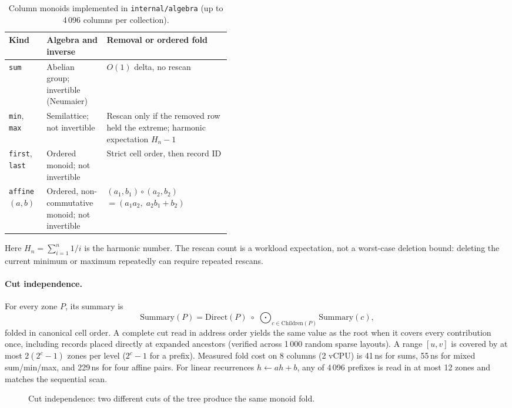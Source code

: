 \documentclass[11pt]{article}
\begin{document}
\begin{table}[H]
\centering
\footnotesize
\setlength{\tabcolsep}{4pt}
\renewcommand{\arraystretch}{1.18}
\begin{tabularx}{\linewidth}{@{}>{\raggedright\arraybackslash}p{0.17\linewidth}>{\raggedright\arraybackslash}p{0.27\linewidth}L@{}}
\toprule
Kind & Algebra and inverse & Removal or ordered fold \\
\midrule
\texttt{sum} & Abelian group; invertible (Neumaier) & $O(1)$ delta, no rescan \\
\texttt{min}, \texttt{max} & Semilattice; not invertible & Rescan only if the removed row held the extreme; harmonic expectation $H_n-1$ \\
\texttt{first}, \texttt{last} & Ordered monoid; not invertible & Strict cell order, then record ID \\
\texttt{affine} $(a,b)$ & Ordered, non-commutative monoid; not invertible & $(a_1,b_1)\circ(a_2,b_2)$\newline $=(a_1a_2,\;a_2b_1+b_2)$ \\
\bottomrule
\end{tabularx}
\caption{Column monoids implemented in \texttt{internal/algebra} (up to 4\,096 columns per collection).}
\end{table}

Here $H_n=\sum_{i=1}^{n}1/i$ is the harmonic number. The rescan count is a workload expectation, not a worst-case deletion bound: deleting the current minimum or maximum repeatedly can require repeated rescans.

\paragraph{Cut independence.}
For every zone $P$, its summary is
\[
\mathrm{Summary}(P) = \mathrm{Direct}(P) \;\circ\; \bigodot_{c \in \mathrm{Children}(P)} \mathrm{Summary}(c),
\]
folded in canonical cell order. A complete cut read in address order yields the same value as the root when it covers every contribution once, including records placed directly at expanded ancestors (verified across 1\,000 random sparse layouts). A range $[u, v]$ is covered by at most $2(2^c - 1)$ zones per level ($2^c - 1$ for a prefix). Measured fold cost on 8 columns (2 vCPU) is 41\,ns for sums, 55\,ns for mixed sum/min/max, and 229\,ns for four affine pairs. For linear recurrences $h \leftarrow a h + b$, any of 4\,096 prefixes is read in at most 12 zones and matches the sequential scan.

\begin{figure}[H]
    \centering
    \caption{Cut independence: two different cuts of the tree produce the same monoid fold.}
\end{figure}
\end{document}
